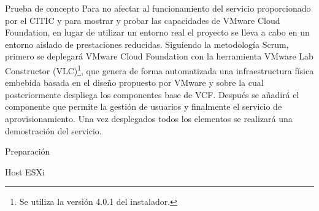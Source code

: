 \begin{section}{Prueba de concepto}
Para no afectar al funcionamiento del servicio proporcionado por el CITIC y para mostrar y probar las capacidades de VMware Cloud Foundation, en lugar de utilizar un entorno real el proyecto se lleva a cabo en un entorno aislado de prestaciones reducidas. Siguiendo la metodología Scrum, primero se deplegará VMware Cloud Foundation con la herramienta VMware Lab Constructor (VLC)\footnote{Se utiliza la versión 4.0.1 del instalador.}, que genera de forma automatizada una infraestructura física embebida basada en el diseño propuesto por VMware y sobre la cual posteriormente despliega los componentes base de VCF. Después se añadirá el componente que permite la gestión de usuarios y finalmente el servicio de aprovisionamiento. Una vez desplegados todos los elementos se realizará una demostración del servicio.

\begin{subsection}{Preparación}
  \begin{subsubsection}{Host ESXi}  
  

\end{subsubsection}
\end{subsection}
\end{section}
